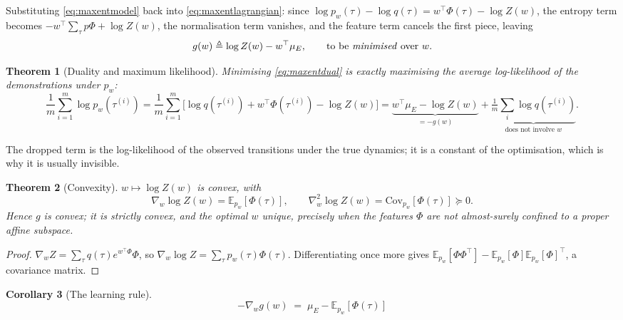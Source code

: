 \documentclass[11pt]{article}
\theoremstyle{plain}
\newtheorem{theorem}{Theorem}[section]
\newtheorem{corollary}[theorem]{Corollary}
\theoremstyle{definition}
\theoremstyle{remark}
\newcommand{\E}{\mathbb{E}}
\begin{document}
Substituting \eqref{eq:maxentmodel} back into \eqref{eq:maxentlagrangian}:
since $\log p_w(\tau) - \log q(\tau) = w^\top\Phi(\tau) - \log Z(w)$, the
entropy term becomes $-w^\top\sum_\tau p\Phi + \log Z(w)$, the
normalisation term vanishes, and the feature term cancels the first
piece, leaving
\begin{equation}
g(w) \triangleq \log Z(w) - w^\top \mu_E, \qquad \text{to be
\emph{minimised} over } w.
\label{eq:maxentdual}
\end{equation}

\begin{theorem}[Duality and maximum likelihood]\label{thm:maxentduality}
Minimising \eqref{eq:maxentdual} is exactly maximising the average
log-likelihood of the demonstrations under $p_w$:
\begin{equation}
\frac1m\sum_{i=1}^m \log p_w(\tau^{(i)})
= \frac1m\sum_{i=1}^m \Big[\log q(\tau^{(i)}) + w^\top\Phi(\tau^{(i)}) - \log Z(w)\Big]
= \underbrace{w^\top\mu_E - \log Z(w)}_{=-g(w)}
+ \underbrace{\tfrac1m\sum_i \log q(\tau^{(i)})}_{\text{does not involve } w}.
\label{eq:maxentmle}
\end{equation}
\end{theorem}

The dropped term is the log-likelihood of the observed transitions under
the true dynamics; it is a constant of the optimisation, which is why it
is usually invisible.

\begin{theorem}[Convexity]\label{thm:logzconvex}
$w\mapsto \log Z(w)$ is convex, with
\begin{equation}
\nabla_w \log Z(w) = \E_{p_w}[\Phi(\tau)], \qquad
\nabla_w^2 \log Z(w) = \mathrm{Cov}_{p_w}[\Phi(\tau)] \succeq 0.
\label{eq:logzgrad}
\end{equation}
Hence $g$ is convex; it is strictly convex, and the optimal $w$ unique,
precisely when the features $\Phi$ are not almost-surely confined to a
proper affine subspace.
\end{theorem}

\begin{proof}
$\nabla_w Z = \sum_\tau q(\tau)e^{w^\top\Phi}\Phi$, so $\nabla_w \log Z =
\sum_\tau p_w(\tau)\Phi(\tau)$. Differentiating once more gives
$\E_{p_w}[\Phi\Phi^\top] - \E_{p_w}[\Phi]\E_{p_w}[\Phi]^\top$, a covariance
matrix.
\end{proof}

\begin{corollary}[The learning rule]
\begin{equation}
\boxed{-\nabla_w g(w) \;=\; \mu_E - \E_{p_w}[\Phi(\tau)]}
\label{eq:learningrule}
\end{equation}
\end{corollary}
\end{document}
